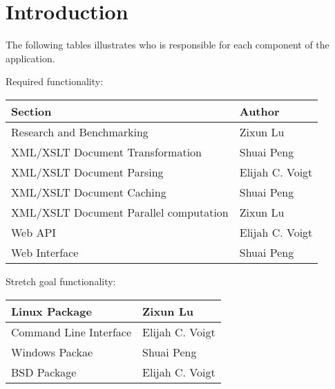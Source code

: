 \section{Introduction}

The following tables illustrates who is responsible for each component of the application.

Required functionality:

\begin{center}
    \begin{tabular}{ | l | p{10cm} |}
    \hline
    Section & Author \\ \hline
    Research and Benchmarking & Zixun Lu \\ \hline
    XML/XSLT Document Transformation & Shuai Peng \\ \hline
    XML/XSLT Document Parsing & Elijah C. Voigt \\ \hline
    XML/XSLT Document Caching & Shuai Peng \\ \hline
    XML/XSLT Document Parallel computation & Zixun Lu \\ \hline
    Web API & Elijah C. Voigt\\ \hline
    Web Interface & Shuai Peng \\ \hline
    \end{tabular}
\end{center}

Stretch goal functionality:

\begin{center}
    \begin{tabular}{ | l | p{10cm} |}
    \hline
    Linux Package & Zixun Lu \\ \hline
    Command Line Interface& Elijah C. Voigt \\ \hline
    Windows Packae & Shuai Peng \\ \hline
    BSD Package & Elijah C. Voigt \\ \hline
    \end{tabular}
\end{center}

\tableofcontents

\clearpage


\newpage

\printbibliography
